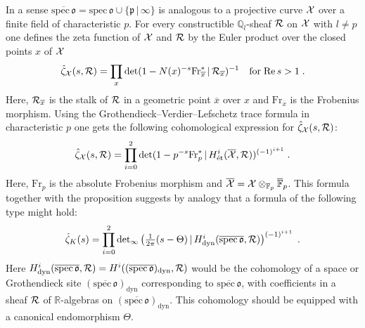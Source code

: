 \documentclass[11pt,leqno]{article}
\newcommand{\et}{\mathrm{\acute{e}t}}
\newcommand{\oeX}{\overline{\eX}}
\newcommand{\OF}{\overline{\F}}
\newcommand{\hzeta}{\hat{\zeta}}
\newcommand{\ox}{\overline{x}}
\newcommand{\F}{{\mathbb{F}}}
\newcommand{\Q}{{\mathbb{Q}}}
\newcommand{\R}{{\mathbb{R}}}
\newcommand{\ddet}{\mathrm{det}}
\newcommand{\dyn}{\mathrm{dyn}}
\newcommand{\spec}{\mathrm{spec}\,}
\newcommand{\Fr}{\mathrm{Fr}}
\newcommand{\RRe}{\mathrm{Re}\,}
\newcommand{\Rh}{{\cal R}}
\newcommand{\eX}{{\cal X}}
\newcommand{\eo}{\mathfrak{o}}
\newcommand{\ep}{\mathfrak{p}}
\newcommand{\tei}{\, | \,}
\begin{document}
In a sense $\overline{\spec \eo} = \spec \eo \cup \{ \ep \tei \infty \}$ is analogous to a projective curve $\eX$ over a finite field of characteristic $p$. For every constructible $\Q_l$-sheaf $\Rh$ on $\eX$ with $l \neq p$ one defines the zeta function of $\eX$ and $\Rh$ by the Euler product over the closed points $x$ of $\eX$
\[
\hzeta_{\eX} (s, \Rh) = \prod_x \ddet (1 - N (x)^{-s} \Fr^*_{\ox} \tei \Rh_{\ox})^{-1} \quad \mbox{for} \; \RRe s > 1 \; .
\]
Here, $\Rh_{\ox}$ is the stalk of $\Rh$ in a geometric point $\ox$ over $x$ and $\Fr_{\ox}$ is the Frobenius morphism. Using the Grothendieck--Verdier--Lefschetz trace formula in characteristic $p$ one gets the following cohomological expression for $\hzeta_{\eX} (s, \Rh)$:
\[
\hzeta_{\eX} (s, \Rh) = \prod^2_{i=0} \ddet (1 - p^{-s} \Fr^*_p \tei H^i_{\et} (\oeX , \Rh))^{(-1)^{i+1}} \; .
\]
Here, $\Fr_p$ is the absolute Frobenius morphism and $\oeX = \eX \otimes_{\F_p} \OF_p$. This formula together with the proposition suggests by analogy that a formula of the following type might hold:
\begin{equation}
  \label{eq:2}
  \hat{\zeta}_K (s) = \prod^2_{i=0} \ddet_{\infty} \textstyle \left( \frac{1}{2 \pi} (s -\Theta) \tei H^i_{\dyn} ( \overline{\spec \eo}  , \Rh) \right)^{(-1)^{i+1}} \; .
\end{equation}
Here $H^i_{\dyn} ( \overline{\spec \eo}  , \Rh) = H^i ((\overline{\spec \eo})_{\dyn} , \Rh)$ would be the cohomology of a space or Grothendieck site $(\overline{\spec \eo})_{\dyn} $
corresponding to $\overline{\spec \eo}$, with coefficients in a sheaf $\Rh$ of $\R$-algebras on $(\overline{\spec \eo})_{\dyn}$. This cohomology should be equipped with a canonical endomorphism $\Theta$.
\end{document}
